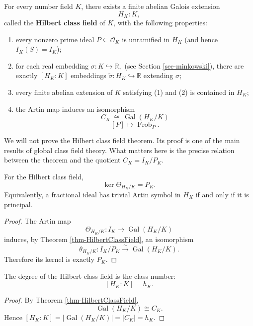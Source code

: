 \begin{theorem}\label{thm-HilbertClassField}
For every number field $K$, there exists a finite abelian Galois extension
\[
H_K:K,
\]
called the {\bf Hilbert class field} of $K$, with the following properties:
\begin{enumerate}
    \item every nonzero prime ideal $P\subseteq\mathcal O_K$ is unramified in $H_K$ (and hence $I_K(S) = I_K$);
    \item for each real embedding
\(\sigma:K\hookrightarrow\mathbb R,
\) (see Section \ref{sec-minkowski}), there are exactly $[H_K:K]$ embeddings
\(\widetilde{\sigma}:H_K\hookrightarrow\mathbb R
\) extending $\sigma$;
    \item every finite abelian extension of $K$ satisfying (1) and (2) is contained in $H_K$;
    \item the Artin map induces an isomorphism
    \[
    C_K\ \cong\ \operatorname{Gal}(H_K/K)\]
    \[[P]\longmapsto\operatorname{Frob}_P.
    \]
\end{enumerate}
\end{theorem}

We will not prove the Hilbert class field theorem. Its proof is one of the main results of
global class field theory. What matters here is the precise relation between the theorem and
the quotient $C_K=I_K/P_K$.

\begin{corollary}\label{cor-HilbertKernel}
For the Hilbert class field,
\[
\boxed{\ker\Theta_{H_K/K}=P_K.}
\]
Equivalently, a fractional ideal has trivial Artin symbol in $H_K$ if and only if it is
principal.
\end{corollary}

\begin{proof}
The Artin map
\[
\Theta_{H_K/K}:I_K\longrightarrow\operatorname{Gal}(H_K/K)
\]
induces, by Theorem \ref{thm-HilbertClassField}, an isomorphism
\[
\theta_{H_K/K}:I_K/P_K\xrightarrow{\sim}\operatorname{Gal}(H_K/K).
\]
Therefore its kernel is exactly $P_K$.
\end{proof}

\begin{corollary}\label{cor-HilbertDegree}
The degree of the Hilbert class field is the class number:
\[
\boxed{[H_K:K]=h_K.}
\]
\end{corollary}

\begin{proof}
By Theorem \ref{thm-HilbertClassField},
\[
\operatorname{Gal}(H_K/K)\cong C_K.
\]
Hence
\([H_K:K]=|\operatorname{Gal}(H_K/K)|=|C_K|=h_K.
\)
\end{proof}

